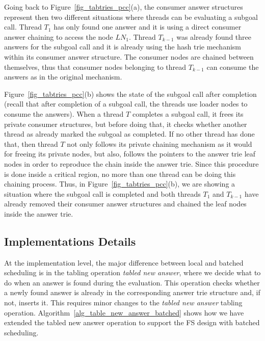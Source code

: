 \documentclass{llncs}
\begin{document}
Going back to Figure~\ref{fig_tabtries_pcc}(a), the consumer answer
structures represent then two different situations where threads can
be evaluating a subgoal call. Thread $T_1$ has only found one answer
and it is using a direct consumer answer chaining to access the node
$LN_1$. Thread $T_{k-1}$ was already found three answers for the
subgoal call and it is already using the hash trie mechanism within
its consumer answer structure. The consumer nodes are chained between
themselves, thus that consumer nodes belonging to thread $T_{k-1}$ can
consume the answers as in the original mechanism.

Figure~\ref{fig_tabtries_pcc}(b) shows the state of the subgoal call
after completion (recall that after completion of a subgoal call, the
threads use loader nodes to consume the answers). When a thread $T$
completes a subgoal call, it frees its private consumer structures,
but before doing that, it checks whether another thread as already
marked the subgoal as completed. If no other thread has done that,
then thread $T$ not only follows its private chaining mechanism as it
would for freeing its private nodes, but also, follows the pointers to
the answer trie leaf nodes in order to reproduce the chain inside the
answer trie. Since this procedure is done inside a critical region, no
more than one thread can be doing this chaining process. Thus, in
Figure~\ref{fig_tabtries_pcc}(b), we are showing a situation where the
subgoal call is completed and both threads $T_1$ and $T_{k-1}$ have
already removed their consumer answer structures and chained the leaf
nodes inside the answer trie.

\subsection{Implementations Details}

At the implementation level, the major difference between local and
batched scheduling is in the tabling operation \emph{tabled new
  answer}, where we decide what to do when an answer is found during
the evaluation. This operation checks whether a newly found answer is
already in the corresponding answer trie structure and, if not,
inserts it. This requires minor changes to the \emph{tabled new
  answer} tabling
operation. Algorithm~\ref{alg_table_new_answer_batched} shows how we
have extended the tabled new answer operation to support the FS design
with batched scheduling.
\end{document}
